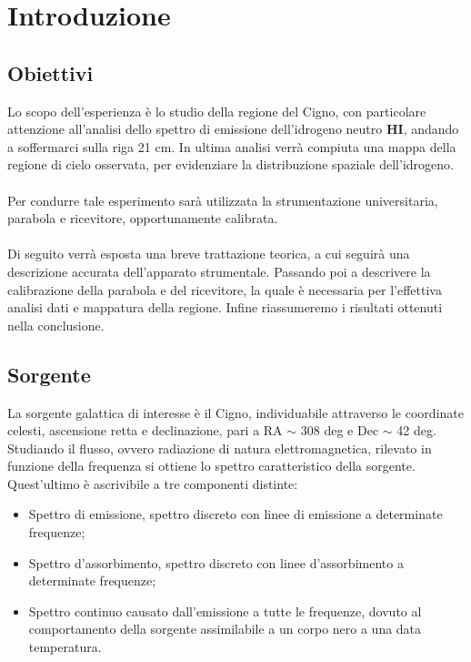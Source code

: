 \section{Introduzione}

\subsection{Obiettivi}
Lo scopo dell'esperienza è lo studio della regione del Cigno, con particolare attenzione all'analisi dello spettro di emissione dell'idrogeno neutro $\textbf{HI}$, andando a soffermarci sulla riga 21 cm. 
In ultima analisi verrà compiuta una mappa della regione di cielo osservata, per evidenziare la distribuzione spaziale dell'idrogeno.
\\\\
Per condurre tale esperimento sarà utilizzata la strumentazione universitaria, parabola e ricevitore, opportunamente calibrata.
\\\\
Di seguito verrà esposta una breve trattazione teorica, a cui seguirà una descrizione accurata dell'apparato strumentale. Passando poi a descrivere la calibrazione della parabola e del ricevitore, la quale è necessaria per l'effettiva analisi dati e mappatura della regione. Infine riassumeremo i risultati ottenuti nella conclusione.



\subsection{Sorgente}
La sorgente galattica di interesse è il Cigno, individuabile attraverso le coordinate celesti, ascensione retta e declinazione, pari a RA $\sim$ 308 deg e Dec $\sim$ 42 deg.
Studiando il flusso, ovvero radiazione di natura elettromagnetica, rilevato in funzione della frequenza si ottiene lo spettro caratteristico della sorgente. Quest'ultimo è ascrivibile a tre componenti distinte: 
\begin{itemize}
\item Spettro di emissione, spettro discreto con linee di emissione a determinate frequenze;
\item Spettro d'assorbimento, spettro discreto con linee d'assorbimento a determinate frequenze;
\item Spettro continuo causato dall'emissione a tutte le frequenze, dovuto al comportamento della sorgente assimilabile a un corpo nero a una data temperatura. 
\end{itemize}

